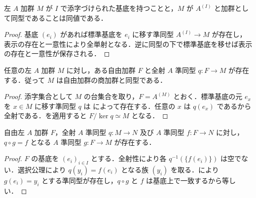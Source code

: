 \begin{prop}[基底と直和による自由加群の特徴づけ]
左 $A$ 加群 $M$ が $I$ で添字づけられた基底を持つことと，$M$ が $A^{(I)}$ と加群として同型であることは同値である．
\end{prop}
\begin{proof}
基底 $(e_i)$ があれば標準基底を $e_i$ に移す準同型 $A^{(I)}\to M$ が存在し，表示の存在と一意性により全単射となる．逆に同型の下で標準基底を移せば表示の存在と一意性が保存される．
\end{proof}
\begin{prop}[自由加群からの全射]
任意の左 $A$ 加群 $M$ に対し，ある自由加群 $F$ と全射 $A$ 準同型 $q:F\to M$ が存在する．従って $M$ は自由加群の商加群と同型である．
\end{prop}
\begin{proof}
添字集合として $M$ の台集合を取り，$F=A^{(M)}$ とおく．標準基底の元 $e_x$ を $x\in M$ に移す準同型 $q$ は によって存在する．任意の $x$ は $q(e_x)$ であるから全射である．を適用すると $F/\ker q\simeq M$ となる．
\end{proof}
\begin{prop}[自由加群からの準同型の持上げ]
自由左 $A$ 加群 $F$，全射 $A$ 準同型 $q:M\to N$ 及び $A$ 準同型 $f:F\to N$ に対し，$q\circ g=f$ となる $A$ 準同型 $g:F\to M$ が存在する．
\end{prop}
\begin{proof}
$F$ の基底を $(e_i)_{i\in I}$ とする．全射性により各 $q^{-1}(\{f(e_i)\})$ は空でない．選択公理により $q(y_i)=f(e_i)$ となる族 $(y_i)$ を取る．により $g(e_i)=y_i$ とする準同型が存在し，$q\circ g$ と $f$ は基底上で一致するから等しい．
\end{proof}
